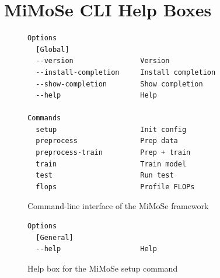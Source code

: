 \documentclass{article}
\begin{document}
\section*{MiMoSe CLI Help Boxes}
  
\begin{figure}[h]
\centering
\begin{tcolorbox}[
  colback=lightgreenbg,
  colframe=lightgreenframe,
  arc=2mm,
  boxrule=0.6pt,
  title=MiMoSe CLI,
  fonttitle=\bfseries
]
\begin{Verbatim}[breaklines=true,breakanywhere=true,fontsize=\small]
Options
  [Global]
  --version                Version
  --install-completion     Install completion
  --show-completion        Show completion
  --help                   Help

Commands
  setup                    Init config
  preprocess               Prep data
  preprocess-train         Prep + train
  train                    Train model
  test                     Run test
  flops                    Profile FLOPs
\end{Verbatim}
\end{tcolorbox}
\caption{Command-line interface of the MiMoSe framework}
\label{fig:mimose_cli}
\end{figure}

\begin{figure}[h]
\centering
\begin{tcolorbox}[
  colback=lightgreenbg,
  colframe=lightgreenframe,
  arc=2mm,
  boxrule=0.6pt,
  title=MiMoSe setup,
  fonttitle=\bfseries
]
\begin{Verbatim}[breaklines=true,breakanywhere=true,fontsize=\small]
Options
  [General]
  --help                   Help
\end{Verbatim}
\end{tcolorbox}
\caption{Help box for the MiMoSe setup command}
\label{fig:mimose_setup}
\end{figure}
\end{document}
